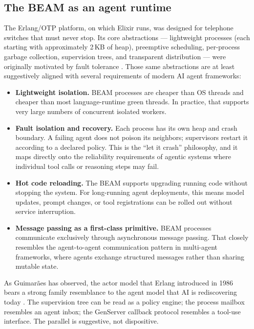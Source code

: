 \documentclass[11pt]{article}
\newcommand{\elixir}{Elixir}
\begin{document}
\subsection{The BEAM as an agent runtime}

The Erlang/OTP platform, on which \elixir{} runs, was designed for telephone switches that must never stop. Its core abstractions --- lightweight processes (each starting with approximately 2\,KB of heap), preemptive scheduling, per-process garbage collection, supervision trees, and transparent distribution --- were originally motivated by fault tolerance \cite{nvlang}. Those same abstractions are at least suggestively aligned with several requirements of modern AI agent frameworks:

\begin{itemize}
  \item \textbf{Lightweight isolation.} BEAM processes are cheaper than OS threads and cheaper than most language-runtime green threads. In practice, that supports very large numbers of concurrent isolated workers.
  \item \textbf{Fault isolation and recovery.} Each process has its own heap and crash boundary. A failing agent does not poison its neighbors; supervisors restart it according to a declared policy. This is the ``let it crash'' philosophy, and it maps directly onto the reliability requirements of agentic systems where individual tool calls or reasoning steps may fail.
  \item \textbf{Hot code reloading.} The BEAM supports upgrading running code without stopping the system. For long-running agent deployments, this means model updates, prompt changes, or tool registrations can be rolled out without service interruption.
  \item \textbf{Message passing as a first-class primitive.} BEAM processes communicate exclusively through asynchronous message passing. That closely resembles the agent-to-agent communication pattern in multi-agent frameworks, where agents exchange structured messages rather than sharing mutable state.
\end{itemize}

As Guimar\~{a}es has observed, the actor model that Erlang introduced in 1986 bears a strong family resemblance to the agent model that AI is rediscovering today \cite{guimaraes}. The supervision tree can be read as a policy engine; the process mailbox resembles an agent inbox; the GenServer callback protocol resembles a tool-use interface. The parallel is suggestive, not dispositive.
\end{document}
